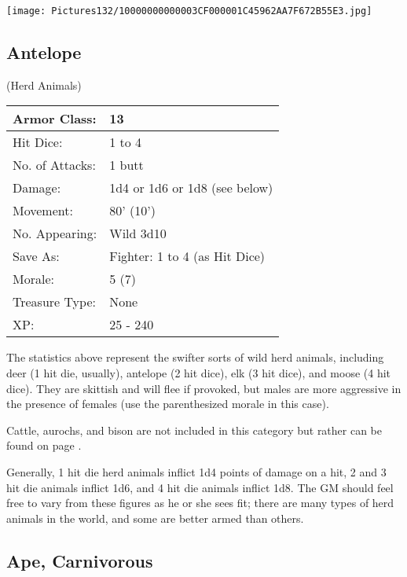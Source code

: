 \documentclass[a4paper,twoside,openany,10pt]{book}
\begin{document}
\begin{multicols}{2}
\vfill

\begin{center}
	\texttt{[image: Pictures132/10000000000003CF000001C45962AA7F672B55E3.jpg]}
\end{center}

\columnbreak

\subsection*{Antelope}(Herd Animals)\label{antelope}

\begin{tabularx}{0.48\textwidth}{ll}
Armor Class: & 13 \\\hline
Hit Dice: & 1 to 4 \\\hline
No. of Attacks: & 1 butt \\\hline
Damage: & 1d4 or 1d6 or 1d8 (see below) \\\hline
Movement: & 80' (10') \\\hline
No. Appearing: & Wild 3d10 \\\hline
Save As: & Fighter: 1 to 4 (as Hit Dice) \\\hline
Morale: & 5 (7) \\\hline
Treasure Type: & None \\\hline
XP: & 25 - 240 \\\hline
\end{tabularx}\medskip

The statistics above represent the swifter sorts of wild herd animals, including deer (1 hit die, usually), antelope (2 hit dice), elk (3 hit dice), and moose (4 hit dice). They are skittish and will flee if provoked, but males are more aggressive in the presence of females (use the parenthesized morale in this case).

Cattle, aurochs, and bison are not included in this category but rather can be found on page \hyperlink{cattle-including-aurochs-and-bison}{\pageref{cattle-including-aurochs-and-bison}}. 

Generally, 1 hit die herd animals inflict 1d4 points of damage on a hit, 2 and 3 hit die animals inflict 1d6, and 4 hit die animals inflict 1d8. The GM should feel free to vary from these figures as he or she sees fit; there are many types of herd animals in the world, and some are better armed than others.

\subsection*{Ape, Carnivorous}\label{ape-carnivorous}


\end{multicols}
\end{document}

